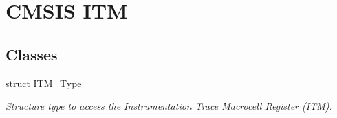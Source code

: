 \hypertarget{group___c_m_s_i_s___i_t_m}{\section{C\-M\-S\-I\-S I\-T\-M}
\label{group___c_m_s_i_s___i_t_m}
}
\subsection*{Classes}
\begin{DoxyCompactItemize}
\item 
struct \hyperlink{struct_i_t_m___type}{I\-T\-M\-\_\-\-Type}
\begin{DoxyCompactList}\small\item\em Structure type to access the Instrumentation Trace Macrocell Register (I\-T\-M). \end{DoxyCompactList}\end{DoxyCompactItemize}
